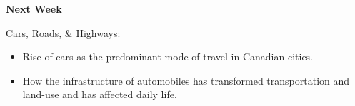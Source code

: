 \documentclass[aspectratio=169]{beamer}
\begin{document}







% 




\begin{frame}
	\textbf{Next Week} 
	
	\vspace{4mm}
	
	Cars, Roads, \& Highways:
	
	\begin{itemize}
		
		
		\item Rise of cars as the predominant mode of travel in Canadian cities. 
		
		\item How the infrastructure of automobiles has transformed transportation and land-use and has affected daily life. 
	\end{itemize}

\end{frame}
\end{document}
